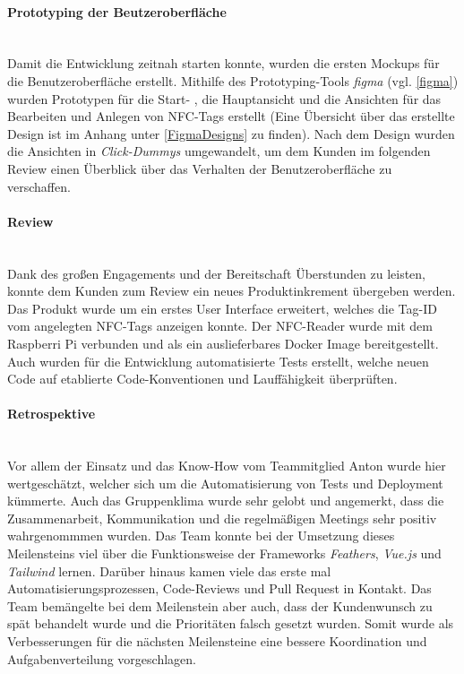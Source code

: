 \documentclass[10pt, a4paper]{article}
\begin{document}
\begin{onehalfspace}
\paragraph*{Prototyping der Beutzeroberfläche} $~$ \\
Damit die Entwicklung zeitnah starten konnte, wurden die ersten Mockups für die Benutzeroberfläche erstellt.
Mithilfe des Prototyping-Tools \textit{figma} (vgl. \ref*{figma}) wurden Prototypen für die Start- , die Hauptansicht und die Ansichten
für das Bearbeiten und Anlegen von NFC-Tags erstellt (Eine Übersicht über das erstellte Design ist im Anhang unter \ref*{FigmaDesigns} zu finden).
Nach dem Design wurden die Ansichten in \textit{Click-Dummys} umgewandelt, um dem Kunden im folgenden Review einen Überblick über das Verhalten der
Benutzeroberfläche zu verschaffen.

\paragraph*{Review} $~$ \\
Dank des großen Engagements und der Bereitschaft Überstunden zu leisten, konnte dem Kunden zum Review ein neues Produktinkrement übergeben werden.
Das Produkt wurde um ein erstes User Interface erweitert, welches die Tag-ID vom angelegten NFC-Tags anzeigen konnte.
Der NFC-Reader wurde mit dem Raspberri Pi verbunden und als ein auslieferbares Docker Image bereitgestellt.
Auch wurden für die Entwicklung automatisierte Tests erstellt, welche neuen Code auf etablierte Code-Konventionen und Lauffähigkeit überprüften.

\paragraph*{Retrospektive} $~$ \\
Vor allem der Einsatz und das Know-How vom Teammitglied Anton wurde hier wertgeschätzt, welcher sich um die Automatisierung von Tests und Deployment kümmerte.
Auch das Gruppenklima wurde sehr gelobt und angemerkt, dass die Zusammenarbeit, Kommunikation und die regelmäßigen Meetings sehr positiv wahrgenommmen wurden.
Das Team konnte bei der Umsetzung dieses Meilensteins viel über die Funktionsweise der Frameworks \textit{Feathers}, \textit{Vue.js} und \textit{Tailwind} lernen.
Darüber hinaus kamen viele das erste mal Automatisierungsprozessen, Code-Reviews und Pull Request in Kontakt.
Das Team bemängelte bei dem Meilenstein aber auch, dass der Kundenwunsch zu spät behandelt wurde und die Prioritäten falsch gesetzt wurden.
Somit wurde als Verbesserungen für die nächsten Meilensteine eine bessere Koordination und Aufgabenverteilung vorgeschlagen.


\end{onehalfspace}
\end{document}

